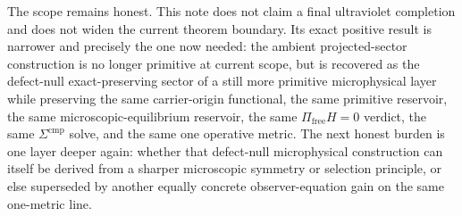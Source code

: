 \documentclass[11pt]{article}
\begin{document}
The scope remains honest. This note does not claim a final ultraviolet completion and does not widen the current theorem boundary. Its exact positive result is narrower and precisely the one now needed: the ambient projected-sector construction is no longer primitive at current scope, but is recovered as the defect-null exact-preserving sector of a still more primitive microphysical layer while preserving the same carrier-origin functional, the same primitive reservoir, the same microscopic-equilibrium reservoir, the same \(\Pi_{\mathrm{free}}H=0\) verdict, the same \(\Sigma^{\mathrm{cmp}}\) solve, and the same one operative metric. The next honest burden is one layer deeper again: whether that defect-null microphysical construction can itself be derived from a sharper microscopic symmetry or selection principle, or else superseded by another equally concrete observer-equation gain on the same one-metric line.
\end{document}
